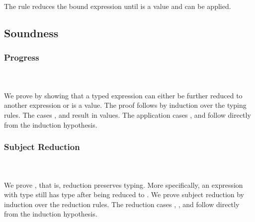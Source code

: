 \noindent The rule  reduces the bound expression  until  is a value and  can be applied. 

\subsection{Soundness}

\subsubsection{Progress}\hfill\\\\
We prove  by showing that a typed expression  can either be further reduced to another expression  or  is a value. 
The proof follows by induction over the typing rules. 
\newpage
\FProgress
The cases ,  and  result in values. 
The application cases ,  and  follow directly from the induction hypothesis. 
\subsubsection{Subject Reduction}\hfill\\\\
We prove , that is, reduction preserves typing. 
More specifically, an expression  with type  still has type  after being reduced to . 
We prove subject reduction by induction over the reduction rules. 
\FSubjectReduction
The  reduction cases , ,  and  follow directly from the induction hypothesis. 

